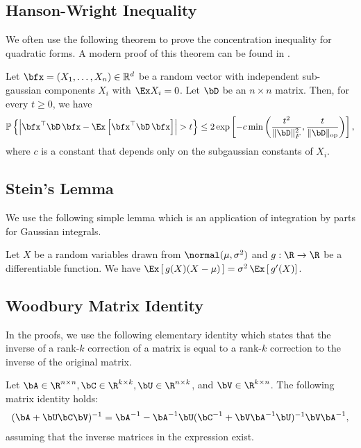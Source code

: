 \subsection{Hanson-Wright Inequality}
We often use the following theorem  to prove the concentration inequality for quadratic forms. A modern proof of this theorem can be found in \citet{rudelson2013hanson}.

\begin{theorem}
    \label{thm:hanson-wright}
    Let $\bfx=\left(X_1, \ldots, X_n\right) \in \mathbb{R}^d$ be a random vector with independent sub-gaussian components $X_i$ with $\Ex X_i=0$. Let $\bD$ be an $n \times n$ matrix. Then, for every $t \geq 0$, we have
    $$
    \mathbb{P}\left\{\left|\bfx^{\top} \bD\, \bfx-\Ex\left[ \bfx^{\top} \bD\, \bfx\right]\right|>t\right\} \leq 2 \exp \left[-c \min \left(\frac{t^2}{\|\bD\|_{F}^2}, \frac{t}{\|\bD\|_{\rm op}}\right)\right],
    $$
    where $c$ is a constant that depends only on the subgaussian constants of $X_i$.
\end{theorem}
\subsection{Stein's Lemma}
We use the following simple lemma which is an application of integration by parts for Gaussian integrals.
\begin{lemma}
    \label{lemma:stein's}
    Let $X$ be a random variables drawn from $\normal(\mu, \sigma^2)$ and $g:\R \to \R$ be a differentiable function. We have $\Ex\left[\,g(X) (X - \mu)\,\right] = \sigma^2\, \Ex \left[\,g'(X)\right]$.    
\end{lemma}

\subsection{Woodbury Matrix Identity}
In the proofs, we use the following elementary identity which states that the inverse of a rank-$k$ correction of a matrix is equal to a rank-$k$ correction to the inverse of the original matrix. 
\begin{theorem}
    \label{thm:woodbury}
    Let $\bA \in \R^{n \times n}, \bC \in \R^{k \times k}, \bU \in \R^{n \times k}$, and $\bV\in \R^{k \times n}$. The following matrix identity holds:
    \begin{align*}
        (\bA + \bU\bC\bV)^{-1} = \bA^{-1} - \bA^{-1} \bU (\bC^{-1} + \bV \bA^{-1}\bU)^{-1} \bV \bA^{-1},
    \end{align*}
    assuming that the inverse matrices in the expression exist.
\end{theorem}

